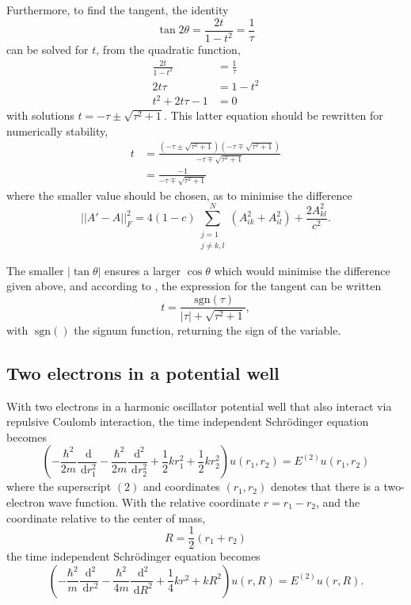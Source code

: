 \documentclass[a4paper,11pt]{article}
\newcommand{\diff}{\ensuremath{\; \text{d}}}
\newcommand{\sgn}{\ensuremath{\; \text{sgn}}}
\begin{document}
Furthermore, to find the tangent, the identity
\[ \tan 2\theta = \frac{2 t}{1 - t^2} = \frac{1}{\tau} \]
can be solved for $t$, from the quadratic function,
\begin{align*}
    \frac{2t}{1 - t^2} &= \frac{1}{\tau}  \\
    2t\tau &= 1 - t^2 \\
    t^2 + 2t \tau - 1 &= 0
\end{align*}
with solutions $t = -\tau \pm \sqrt{\tau^2 + 1}$. This latter equation should be rewritten for numerically stability,
\begin{align*}
    t &= \frac{\left( -\tau \pm \sqrt{\tau^2 + 1}\right) \left( -\tau \mp \sqrt{\tau^2 + 1} \right)}{-\tau \mp \sqrt{\tau^2 + 1} } \\
    &= \frac{-1}{-\tau \mp \sqrt{\tau^2 + 1}}
\end{align*}
where the smaller value should be chosen, as to minimise the difference
\[ ||A' - A||_F^2 = 4\left( 1-c \right) \sum\limits_{\substack{j=1\\j\neq k,l}}^N \left( A_{ik}^2 + A_{il}^2 \right) + \frac{2A^2_{kl}}{c^2}. \]

The smaller $|\tan\theta|$ ensures a larger $\cos\theta$ which would minimise the difference given above, and according to \cite{numrecipes}, the expression for the tangent can be written
\begin{equation}
    t = \frac{\sgn\left( \tau \right)}{|\tau| + \sqrt{\tau^2 + 1} },
    \label{eq:t}
\end{equation}
with $\sgn()$ the signum function, returning the sign of the variable.

\subsection{Two electrons in a potential well}
With two electrons in a harmonic oscillator potential well that also interact via repulsive Coulomb interaction, the time independent Schr\"{o}dinger equation becomes
\begin{equation}
    \left( -\frac{\hbar^2}{2m} \frac{\diff}{\diff r_1^2} - \frac{\hbar^2}{2m} \frac{\diff^2}{\diff r_2^2} + \frac{1}{2} kr_1^2 + \frac{1}{2} kr_2^2 \right) u\left( r_1, r_2 \right) = E^{(2)} u\left( r_1, r_2 \right)
    \label{eq:se2el}
\end{equation}
where the superscript $(2)$ and coordinates $(r_1, r_2)$ denotes that there is a two-electron wave function. With the relative coordinate $r = r_1 - r_2$, and the coordinate relative to the center of mass,
\[ R = \frac{1}{2} \left( r_1 + r_2 \right) \]
the time independent Schr\"{o}dinger equation becomes
\[ \left( -\frac{\hbar^2}{m}\frac{\diff^2}{\diff r^2} - \frac{\hbar^2}{4m}\frac{\diff^2}{\diff R^2} + \frac{1}{4}kr^2 + kR^2 \right) u(r,R) = E^{(2)} u(r,R). \]
\end{document}
